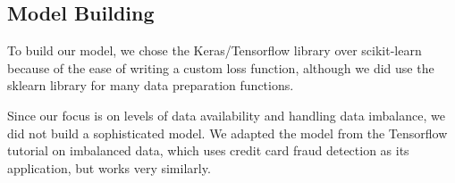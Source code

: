 \subsection{Model Building}

To build our model, we chose the Keras/Tensorflow \citep{chollet2015keras} library over scikit-learn \citep{scikit-learn} because of the ease of writing a custom loss function, although we did use the sklearn library for many data preparation functions.  

Since our focus is on levels of data availability and handling data imbalance, we did not build a sophisticated model.  We adapted the model from the Tensorflow tutorial on imbalanced data, which uses credit card fraud detection as its application, but works very similarly. \citep{Tensorflow_Imbalanced_Data}

